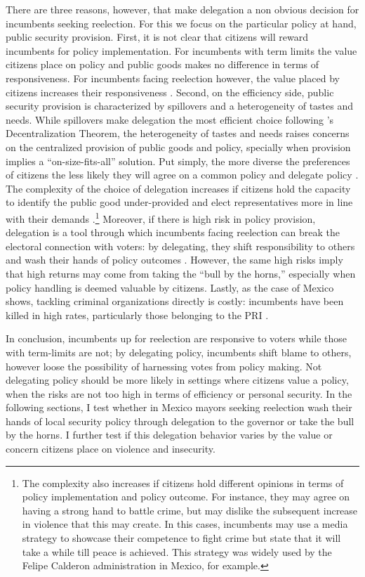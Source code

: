 \documentclass[12pt]{amsart}
\numberwithin{equation}{section}
\theoremstyle{definition}
\theoremstyle{definition}
\theoremstyle{definition}
\begin{document}
There are three reasons, however, that make delegation a non obvious decision for incumbents seeking reelection. For this we focus on the particular policy at hand, public security provision. First, it is not clear that citizens will reward incumbents for policy implementation. For incumbents with term limits the value citizens place on policy and public goods makes no difference in terms of responsiveness. For incumbents facing reelection however, the value placed by citizens increases their responsiveness \citep{lizzeri_2001, milner_2004}. Second, on the efficiency side, public security provision is characterized by spillovers and a heterogeneity of tastes and needs. While spillovers make delegation the most efficient choice following \citet{oates_1972}'s Decentralization Theorem, the heterogeneity of tastes and needs raises concerns on the centralized provision of public goods and policy, specially when provision implies a ``on-size-fits-all'' solution. Put simply, the more diverse the preferences of citizens the less likely they will agree on a common policy and delegate policy \citep{martin_2006, lyne_etal_2006}. The complexity of the choice of delegation increases if citizens hold the capacity to identify the public good under-provided and elect representatives more in line with their demands \citet{Besley_case_1995}.\footnote{The complexity also increases if citizens hold different opinions in terms of policy implementation and policy outcome. For instance, they may agree on having a strong hand to battle crime, but may dislike the subsequent increase in violence that this may create. In this cases, incumbents may use a media strategy to showcase their competence to fight crime but state that it will take a while till peace is achieved. This strategy was widely used by the Felipe Calderon administration in Mexico, for example.} Moreover, if there is high risk in policy provision, delegation is a tool through which incumbents facing reelection can break the electoral connection with voters: by delegating, they shift responsibility to others and wash their hands of policy outcomes \citep{fiorina_1982, loftis_2014}. However, the same high risks imply that high returns may come from taking the ``bull by the horns,'' especially when policy handling is deemed valuable by citizens. Lastly, as the case of Mexico shows, tackling criminal organizations directly is costly: incumbents have been killed in high rates, particularly those belonging to the PRI \citep{ley_trejo_2020}.  

In conclusion, incumbents up for reelection are responsive to voters while those with term-limits are not; by delegating policy, incumbents shift blame to others, however loose the possibility of harnessing votes from policy making. Not delegating policy should be more likely in settings where citizens value a policy, when the risks are not too high in terms of efficiency or personal security. In the following sections, I test whether in Mexico mayors seeking reelection  wash their hands of local security policy through delegation to the governor or take the bull by the horns. I further test if this delegation behavior varies by the value or concern citizens place on violence and insecurity. 
  
\end{document}
